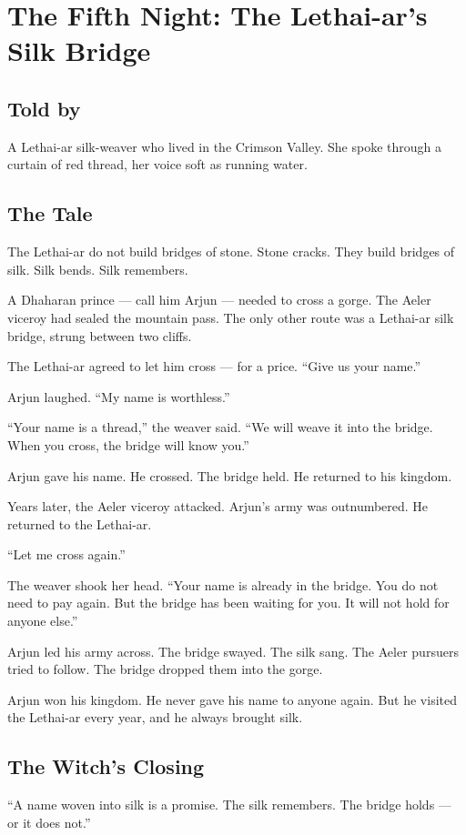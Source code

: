 \documentclass[10pt,twoside]{book}
\begin{document}
\chapter{The Fifth Night: The Lethai-ar's Silk Bridge}

\section*{Told by}
A Lethai-ar silk-weaver who lived in the Crimson Valley. She spoke through a curtain of red thread, her voice soft as running water.

\section*{The Tale}
The Lethai-ar do not build bridges of stone. Stone cracks. They build bridges of silk. Silk bends. Silk remembers.

A Dhaharan prince --- call him Arjun --- needed to cross a gorge. The Aeler viceroy had sealed the mountain pass. The only other route was a Lethai-ar silk bridge, strung between two cliffs.

The Lethai-ar agreed to let him cross --- for a price. ``Give us your name.''

Arjun laughed. ``My name is worthless.''

``Your name is a thread,'' the weaver said. ``We will weave it into the bridge. When you cross, the bridge will know you.''

Arjun gave his name. He crossed. The bridge held. He returned to his kingdom.

Years later, the Aeler viceroy attacked. Arjun's army was outnumbered. He returned to the Lethai-ar.

``Let me cross again.''

The weaver shook her head. ``Your name is already in the bridge. You do not need to pay again. But the bridge has been waiting for you. It will not hold for anyone else.''

Arjun led his army across. The bridge swayed. The silk sang. The Aeler pursuers tried to follow. The bridge dropped them into the gorge.

Arjun won his kingdom. He never gave his name to anyone again. But he visited the Lethai-ar every year, and he always brought silk.

\section*{The Witch's Closing}
``A name woven into silk is a promise. The silk remembers. The bridge holds --- or it does not.''
\end{document}
